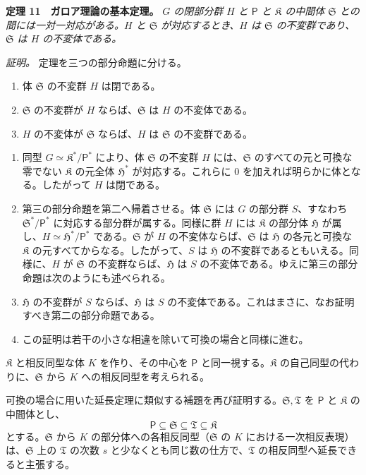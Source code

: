 \textbf{定理 11　ガロア理論の基本定理。} \emph{$G$ の閉部分群 $H$ と $\mathsf P$ と $\mathfrak K$ の中間体 $\mathfrak S$ との間には一対一対応がある。$H$ と $\mathfrak S$ が対応するとき、$H$ は $\mathfrak S$ の不変群であり、$\mathfrak S$ は $H$ の不変体である。}

\emph{証明。} 定理を三つの部分命題に分ける。
\begin{enumerate}
\item 体 $\mathfrak S$ の不変群 $H$ は閉である。
\item $\mathfrak S$ の不変群が $H$ ならば、$\mathfrak S$ は $H$ の不変体である。
\item $H$ の不変体が $\mathfrak S$ ならば、$H$ は $\mathfrak S$ の不変群である。
\end{enumerate}

\begin{enumerate}
\item 同型 $G\simeq\mathfrak K^*/\mathsf P^*$ により、体 $\mathfrak S$ の不変群 $H$ には、$\mathfrak S$ のすべての元と可換な零でない $\mathfrak K$ の元全体 $\mathfrak H^*$ が対応する。これらに $0$ を加えれば明らかに体となる。したがって $H$ は閉である。

\item 第三の部分命題を第二へ帰着させる。体 $\mathfrak S$ には $G$ の部分群 $S$、すなわち $\mathfrak S^*/\mathsf P^*$ に対応する部分群が属する。同様に群 $H$ には $\mathfrak K$ の部分体 $\mathfrak H$ が属し、$H\simeq\mathfrak H^*/\mathsf P^*$ である。$\mathfrak S$ が $H$ の不変体ならば、$\mathfrak S$ は $\mathfrak H$ の各元と可換な $\mathfrak K$ の元すべてからなる。したがって、$S$ は $\mathfrak H$ の不変群であるともいえる。同様に、$H$ が $\mathfrak S$ の不変群ならば、$\mathfrak H$ は $S$ の不変体である。ゆえに第三の部分命題は次のようにも述べられる。

\item[$(3')$.] $\mathfrak H$ の不変群が $S$ ならば、$\mathfrak H$ は $S$ の不変体である。これはまさに、なお証明すべき第二の部分命題である。

\item[3.] この証明は若干の小さな相違を除いて可換の場合と同様に進む。
\end{enumerate}

$\mathfrak K$ と相反同型な体 $K$ を作り、その中心を $\mathsf P$ と同一視する。$\mathfrak K$ の自己同型の代わりに、$\mathfrak S$ から $K$ への相反同型を考えられる。

可換の場合に用いた延長定理に類似する補題を再び証明する。$\mathfrak S,\mathfrak T$ を $\mathsf P$ と $\mathfrak K$ の中間体とし、
\[
\mathsf P \subseteq \mathfrak S \subseteq \mathfrak T \subseteq \mathfrak K
\]
とする。$\mathfrak S$ から $K$ の部分体への各相反同型（$\mathfrak S$ の $K$ における一次相反表現）は、$\mathfrak S$ 上の $\mathfrak T$ の次数 $s$ と少なくとも同じ数の仕方で、$\mathfrak T$ の相反同型へ延長できると主張する。

